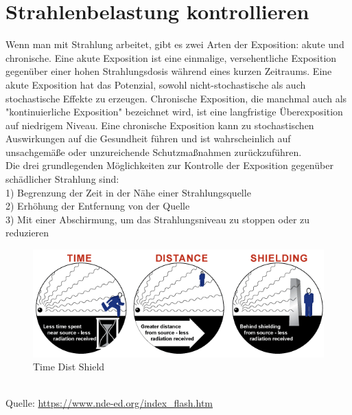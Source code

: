 \section{Strahlenbelastung kontrollieren}
\label{sec:Strahlenbelastung }
Wenn man mit Strahlung arbeitet, gibt es zwei Arten der Exposition: akute und chronische. Eine akute Exposition ist eine einmalige, versehentliche Exposition gegenüber einer hohen Strahlungsdosis während eines kurzen Zeitraums. Eine akute Exposition hat das Potenzial, sowohl nicht-stochastische als auch stochastische Effekte zu erzeugen. Chronische Exposition, die manchmal auch als "kontinuierliche Exposition" bezeichnet wird, ist eine langfristige Überexposition auf niedrigem Niveau. Eine chronische Exposition kann zu stochastischen Auswirkungen auf die Gesundheit führen und ist wahrscheinlich auf unsachgemäße oder unzureichende Schutzmaßnahmen zurückzuführen.\\
Die drei grundlegenden Möglichkeiten zur Kontrolle der Exposition gegenüber schädlicher Strahlung sind:\\
1) Begrenzung der Zeit in der Nähe einer Strahlungsquelle\\
2) Erhöhung der Entfernung von der Quelle\\
3) Mit einer Abschirmung, um das Strahlungsniveau zu stoppen oder zu reduzieren\\
\begin{figure}[htb]
  \centering  
  \includegraphics[scale=0.5]{img/TimeDistShield.png}
  \caption{Time Dist Shield}
  \label{fig:TimeDistShield}
\end{figure}\\
 Quelle: \url{https://www.nde-ed.org/index_flash.htm}
